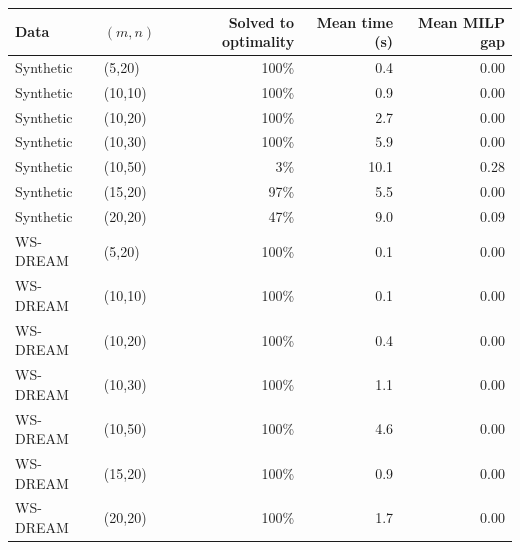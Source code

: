 \begin{tabular}{llrrr}\toprule
Data & $(m,n)$ & Solved to optimality & Mean time (s) & Mean MILP gap\\\midrule
Synthetic & (5,20) & 100\% & 0.4 & 0.00\\
Synthetic & (10,10) & 100\% & 0.9 & 0.00\\
Synthetic & (10,20) & 100\% & 2.7 & 0.00\\
Synthetic & (10,30) & 100\% & 5.9 & 0.00\\
Synthetic & (10,50) & 3\% & 10.1 & 0.28\\
Synthetic & (15,20) & 97\% & 5.5 & 0.00\\
Synthetic & (20,20) & 47\% & 9.0 & 0.09\\
WS-DREAM & (5,20) & 100\% & 0.1 & 0.00\\
WS-DREAM & (10,10) & 100\% & 0.1 & 0.00\\
WS-DREAM & (10,20) & 100\% & 0.4 & 0.00\\
WS-DREAM & (10,30) & 100\% & 1.1 & 0.00\\
WS-DREAM & (10,50) & 100\% & 4.6 & 0.00\\
WS-DREAM & (15,20) & 100\% & 0.9 & 0.00\\
WS-DREAM & (20,20) & 100\% & 1.7 & 0.00\\
\bottomrule
\end{tabular}
